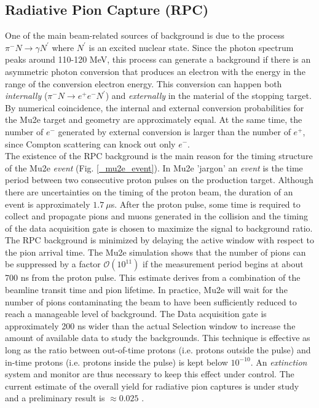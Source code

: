 \documentclass[12pt,a4paper,openright, oneside, titlepage]{book} %
\begin{document}
\subsection{Radiative Pion Capture (RPC)}
One of the main beam-related sources of background is due to the process $\pi^- N \rightarrow \gamma N^\prime$ where $N^\prime$ is an excited nuclear state. 
Since the photon spectrum peaks around 110-120 MeV, this process can generate a background if there is an asymmetric photon conversion that produces an electron with the energy in the range of the conversion electron energy. 
This conversion can happen both \textit{internally} ($\pi^- N \rightarrow e^+e^- N^\prime$) and \textit{externally} in the material of the stopping target.
By numerical coincidence, the internal and external conversion probabilities for the Mu2e target and geometry are approximately equal. 
At the same time, the number of $e^-$ generated by external conversion is larger than the number of $e^+$, since Compton scattering can knock out only $e^-$.\\
The existence of the RPC background is the main reason for the timing structure of the Mu2e \textit{event} (Fig. \ref{_mu2e_event}). 
In Mu2e 'jargon' an \textit{event}  is the time period between two consecutive proton pulses on the production target. 
Although there are  uncertainties on the timing of the proton beam, 
the duration of an event is approximately $1.7\ \mu$s. 
After the proton pulse, some time is required to collect and propagate pions and muons generated in the collision and the timing of the data acquisition gate is chosen to maximize the signal to background ratio.
The RPC background is minimized by delaying the active window with respect to the pion arrival time. 
The Mu2e simulation shows that the number of pions can be suppressed  by a factor $\mathcal{O}(10^{11})$ if the measurement period begins at about 700 ns from the proton pulse.
This estimate derives from a combination of the beamline transit time and pion lifetime.
In practice, Mu2e will wait for the number of pions contaminating the beam to have been sufficiently reduced to reach a manageable level of background.
The Data acquisition gate is approximately 200 ns wider than the actual Selection window to increase the amount of available data to study the backgrounds.
This technique is effective as long as the ratio between out-of-time protons (i.e. protons outside the pulse) and in-time protons (i.e. protons inside the pulse) is kept below $10^{-10}$. 
An \textit{extinction} system and monitor are thus necessary to keep this effect under control.
The current estimate of the overall yield for radiative pion captures is under study and a preliminary result is $\approx 0.025$ \cite{RPC_now}.
\end{document}
